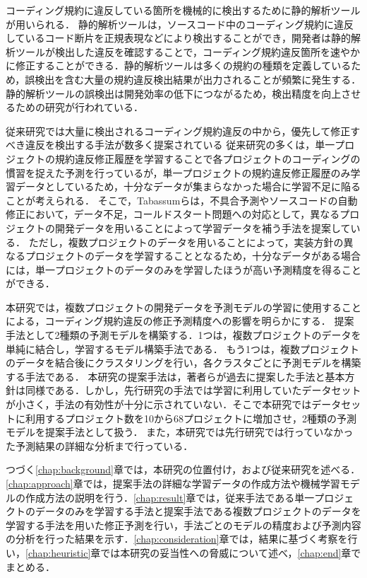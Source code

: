 \documentclass[submit,noauthor,ses,dvipdfmx]{ipsj}
\newcommand{\todo}[1]{\colorbox{yellow}{{\bf TODO}:}{\color{red} {\textbf{[#1]}}}}
\begin{document}
コーディング規約に違反している箇所を機械的に検出するために静的解析ツールが用いられる．
静的解析ツールは，ソースコード中のコーディング規約に違反しているコード断片を正規表現などにより検出することができ，開発者は静的解析ツールが検出した違反を確認することで，コーディング規約違反箇所を速やかに修正することができる．静的解析ツールは多くの規約の種類を定義しているため，誤検出を含む大量の規約違反検出結果が出力されることが頻繁に発生する．静的解析ツールの誤検出は開発効率の低下につながるため，検出精度を向上させるための研究が行われている\cite{Nguyen}．

従来研究では大量に検出されるコーディング規約違反の中から，優先して修正すべき違反を検出する手法が数多く提案されている\cite{JyuraiPre}
従来研究の多くは，単一プロジェクトの規約違反修正履歴を学習することで各プロジェクトのコーディングの慣習を捉えた予測を行っているが，単一プロジェクトの規約違反修正履歴のみ学習データとしているため，十分なデータが集まらなかった場合に学習不足に陥ることが考えられる．
そこで，Tabassumらは，不具合予測やソースコードの自動修正において，データ不足，コールドスタート問題への対応として，異なるプロジェクトの開発データを用いることによって学習データを補う手法を提案している\cite{Tabassum}．
ただし，複数プロジェクトのデータを用いることによって，実装方針の異なるプロジェクトのデータを学習することとなるため，十分なデータがある場合には，単一プロジェクトのデータのみを学習したほうが高い予測精度を得ることができる．

本研究では，複数プロジェクトの開発データを予測モデルの学習に使用することによる，コーディング規約違反の修正予測精度への影響を明らかにする．
提案手法として2種類の予測モデルを構築する．1つは，複数プロジェクトのデータを単純に結合し，学習するモデル構築手法である．
もう1つは，複数プロジェクトのデータを結合後にクラスタリングを行い，各クラスタごとに予測モデルを構築する手法である．
本研究の提案手法は，著者らが過去に提案した手法と基本方針は同様である\cite{mine}\cite{mine_live}．しかし，先行研究の手法では学習に利用していたデータセットが小さく，手法の有効性が十分に示されていない．そこで本研究ではデータセットに利用するプロジェクト数を10から68プロジェクトに増加させ，2種類の予測モデルを提案手法として扱う．
また，本研究では先行研究では行っていなかった予測結果の詳細な分析まで行っている．

つづく\ref{chap:background}章では，本研究の位置付け，および従来研究を述べる．\ref{chap:approach}章では，提案手法の詳細な学習データの作成方法や機械学習モデルの作成方法の説明を行う．\ref{chap:result}章では，従来手法である単一プロジェクトのデータのみを学習する手法と提案手法である複数プロジェクトのデータを学習する手法を用いた修正予測を行い，手法ごとのモデルの精度および予測内容の分析を行った結果を示す．\ref{chap:consideration}章では，結果に基づく考察を行い，\ref{chap:heuristic}章では本研究の妥当性への脅威について述べ，\ref{chap:end}章でまとめる．
\end{document}

